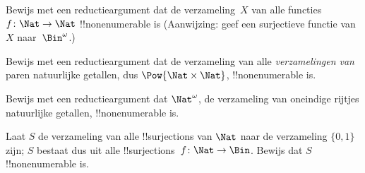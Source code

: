 \documentclass[openany]{memoir}
\begin{document}

\begin{prob}\label{sfr:siz:red:prob:nat-nat}
  Bewijs met een reductieargument dat de verzameling~$X$ van alle
  functies $f\colon \Nat \to \Nat$ !!{nonenumerable} is (Aanwijzing: geef
  een surjectieve functie van $X$ naar~$\Bin^\omega$.)
\end{prob}

\begin{prob}
Bewijs met een reductieargument dat de verzameling van alle
\emph{verzamelingen van} paren natuurlijke getallen, dus
$\Pow{\Nat \times \Nat}$, !!{nonenumerable} is.
\end{prob}

\begin{prob}
Bewijs met een reductieargument dat $\Nat^\omega$, de verzameling van
oneindige rijtjes natuurlijke getallen, !!{nonenumerable} is.
\end{prob}


\begin{prob}
Laat $S$ de verzameling van alle !!{surjection}s van $\Nat$ naar de
verzameling $\{0,1\}$ zijn; $S$ bestaat dus uit alle
!!{surjection}s~$f \colon \Nat \to \Bin$. Bewijs dat $S$
!!{nonenumerable} is.
\end{prob}
\end{document}
